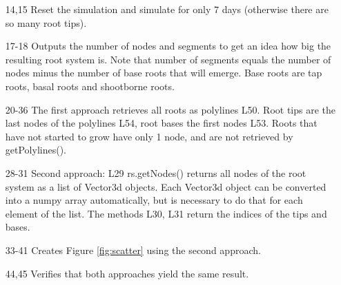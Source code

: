 \begin{itemize}

\item[14,15] Reset the simulation and simulate for only 7 days (otherwise there are so many root tips).

\item[17-18] Outputs the number of nodes and segments to get an idea how big the resulting root system is. 
Note that number of segments equals the number of nodes minus the number of base roots that will emerge. 
Base roots are tap roots, basal roots and shootborne roots.

\item[20-36] The first approach retrieves all roots as polylines L50. 
Root tips are the last nodes of the polylines L54, root bases the first nodes L53. 
Roots that have not started to grow have only 1 node, and are not retrieved by getPolylines().

\item[28-31] Second approach: L29 rs.getNodes() returns all nodes of the root system as a list of Vector3d objects. 
Each Vector3d object can be converted into a numpy array automatically, 
but is necessary to do that for each element of the list. The methods L30, L31 return the indices of the tips and bases. 

\item[33-41] Creates Figure \ref{fig:scatter} using the second approach.

\item[44,45] Verifies that both approaches yield the same result.

\end{itemize}

